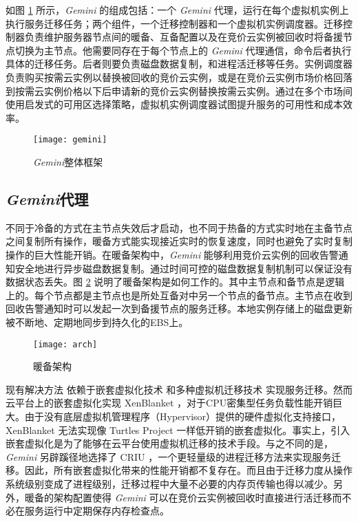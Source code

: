 如图 \ref{figure:gemini} 所示，\emph{Gemini} 的组成包括：一个 \emph{Gemini} 代理，运行在每个虚拟机实例上执行服务迁移任务；两个组件，一个迁移控制器和一个虚拟机实例调度器。迁移控制器负责维护服务器节点间的暖备、互备配置以及在竞价云实例被回收时将备援节点切换为主节点。他需要同存在于每个节点上的 \emph{Gemini} 代理通信，命令后者执行具体的迁移任务。后者则要负责磁盘数据复制，和进程活迁移等任务。实例调度器负责购买按需云实例以替换被回收的竞价云实例，或是在竞价云实例市场价格回落到按需云实例价格以下后申请新的竞价云实例替换按需云实例。通过在多个市场间使用启发式的可用区选择策略，虚拟机实例调度器试图提升服务的可用性和成本效率。
\begin{figure}
  \centering
  \texttt{[image: gemini]}
  \caption{\emph{Gemini}整体框架}
  \label{figure:gemini}
\end{figure}

\subsection{\emph{Gemini}代理}
不同于冷备的方式在主节点失效后才启动，也不同于热备的方式实时地在主备节点之间复制所有操作，暖备方式能实现接近实时的恢复速度，同时也避免了实时复制操作的巨大性能开销。在暖备架构中，\emph{Gemini} 能够利用竞价云实例的回收告警通知安全地进行异步磁盘数据复制。通过时间可控的磁盘数据复制机制可以保证没有数据状态丢失。图 \ref{figure:arch} 说明了暖备架构是如何工作的。其中主节点和备节点是逻辑上的。每个节点都是主节点也是所处互备对中另一个节点的备节点。主节点在收到回收告警通知时可以发起一次到备援节点的服务迁移。本地实例存储上的磁盘更新被不断地、定期地同步到持久化的EBS上。
\begin{figure}
  \centering
  \texttt{[image: arch]}
  \caption{暖备架构}
  \label{figure:arch}
\end{figure}

现有解决方法 \cite{He:2015:CCH:2749246.2749275} 依赖于嵌套虚拟化技术 \cite{Williams:2012:XVO:2168836.2168849} 和多种虚拟机迁移技术 \cite{Singh:2013:YEG:2482626.2482642, Hines:2009:PBL:1508293.1508301} 实现服务迁移。然而云平台上的嵌套虚拟化实现 XenBlanket \cite{Williams:2012:XVO:2168836.2168849}，对于CPU密集型任务负载性能开销巨大。由于没有底层虚拟机管理程序（Hypervisor）提供的硬件虚拟化支持接口，XenBlanket 无法实现像 Turtles Project \cite{Ben-Yehuda:2010:TPD:1924943.1924973} 一样低开销的嵌套虚拟化。事实上，引入嵌套虚拟化是为了能够在云平台使用虚拟机迁移的技术手段。与之不同的是，\emph{Gemini} 另辟蹊径地选择了 CRIU \cite{CRIU:2016}，一个更轻量级的进程迁移方法来实现服务迁移。因此，所有嵌套虚拟化带来的性能开销都不复存在。而且由于迁移力度从操作系统级别变成了进程级别，迁移过程中大量不必要的内存页传输也得以减少。另外，暖备的架构配置使得 \emph{Gemini} 可以在竞价云实例被回收时直接进行活迁移而不必在服务运行中定期保存内存检查点。

